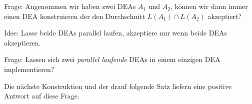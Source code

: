 %                 


Frage: Angenommen wir haben zwei \ac{DEA}s $A_1$ und $A_2$, können wir dann immer einen \ac{DEA} konstruieren der den Durchschnitt $L(A_1)\cap L(A_2)$ akzeptiert?

Idee: Lasse beide \ac{DEA}s parallel laufen, akzeptiere nur wenn beide \ac{DEA}s akzeptieren.

Frage: Lassen sich zwei \emph{parallel laufende} \ac{DEA}s in einem einzigen \ac{DEA} implementieren?

Die nächste Konstruktion und der drauf folgende Satz liefern eine positive Antwort auf diese Frage.

